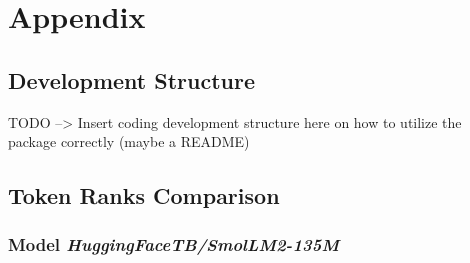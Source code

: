 
\chapter*{Appendix} %
\label{Appendix}


% 
%
%
%

\section*{Development Structure}
\label{appendix:dev-structure}
TODO --> Insert coding development structure here on how to utilize the package 
correctly (maybe a README)



% 
%
%
%
\section*{Token Ranks Comparison}



\subsection*{Model \textit{HuggingFaceTB/SmolLM2-135M}}

